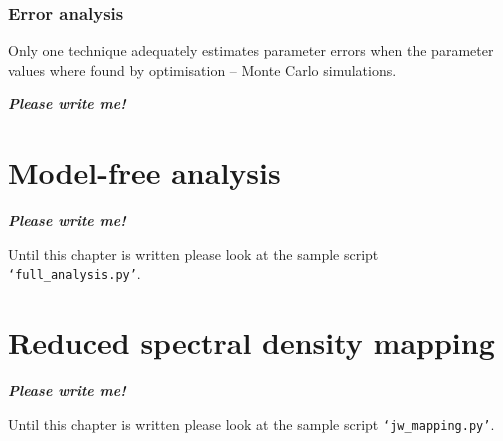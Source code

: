 

\subsubsection{Error analysis}

Only one technique adequately estimates parameter errors when the parameter values where found by optimisation -- Monte Carlo simulations.

\textbf{\textit{Please write me!}}




\newpage
\section{Model-free analysis}

\textbf{\textit{Please write me!}}

Until this chapter is written please look at the sample script \texttt{`full\_analysis.py'}.



\newpage
\section{Reduced spectral density mapping}

\textbf{\textit{Please write me!}}

Until this chapter is written please look at the sample script \texttt{`jw\_mapping.py'}.
